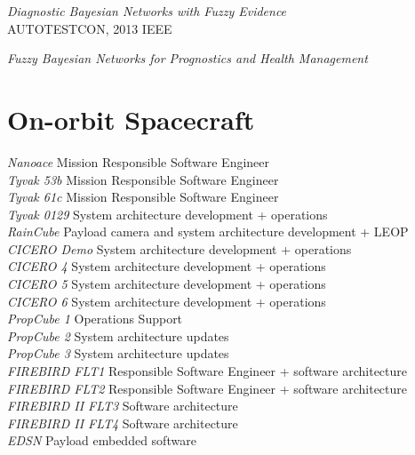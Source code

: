 \documentclass[line,margin]{res}
\begin{document}
\begin{resume}
{\sl Diagnostic Bayesian Networks with Fuzzy Evidence}\\
AUTOTESTCON, 2013 IEEE

{\sl Fuzzy Bayesian Networks for Prognostics and Health Management}\\	

\section{On-orbit Spacecraft}
{\sl Nanoace} \hfill Mission Responsible Software Engineer\\
{\sl Tyvak 53b} \hfill Mission Responsible Software Engineer\\
{\sl Tyvak 61c} \hfill Mission Responsible Software Engineer\\
{\sl Tyvak 0129} \hfill System architecture development + operations\\
{\sl RainCube} \hfill Payload camera and system architecture development + LEOP\\
{\sl CICERO Demo} \hfill System architecture development + operations\\
{\sl CICERO 4} \hfill System architecture development + operations\\
{\sl CICERO 5} \hfill System architecture development + operations\\
{\sl CICERO 6} \hfill System architecture development + operations\\
{\sl PropCube 1} \hfill Operations Support\\
{\sl PropCube 2} \hfill System architecture updates\\
{\sl PropCube 3} \hfill System architecture updates\\
{\sl FIREBIRD FLT1} \hfill Responsible Software Engineer + software architecture\\
{\sl FIREBIRD FLT2} \hfill Responsible Software Engineer + software architecture\\
{\sl FIREBIRD II FLT3} \hfill Software architecture\\
{\sl FIREBIRD II FLT4} \hfill Software architecture\\
{\sl EDSN} \hfill Payload embedded software\\
			
\end{resume}
\end{document}
